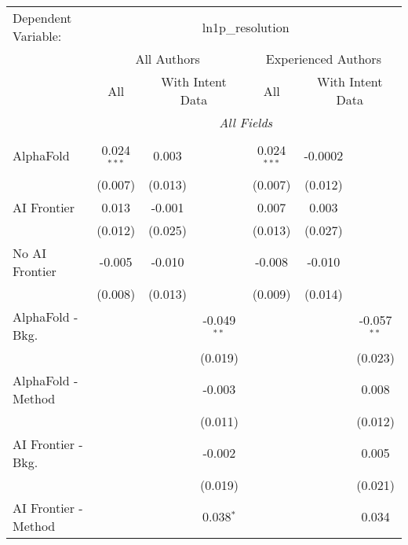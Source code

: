 \begingroup
\centering
\begin{tabular}{lcccccc}
   \tabularnewline \midrule \midrule
   Dependent Variable: & \multicolumn{6}{c}{ln1p\_resolution}\\
 & \multicolumn{3}{c}{All Authors} & \multicolumn{3}{c}{Experienced Authors} \\
\cmidrule(lr){2-4} \cmidrule(lr){5-7}
 & \multicolumn{1}{c}{All} & \multicolumn{2}{c}{With Intent Data} & \multicolumn{1}{c}{All} & \multicolumn{2}{c}{With Intent Data} \\
\cmidrule(lr){2-2} \cmidrule(lr){3-4} \cmidrule(lr){5-5} \cmidrule(lr){6-7}
 & \multicolumn{6}{c}{\textit{All Fields}} \\ \\
   AlphaFold               & 0.024$^{***}$ & 0.003   &               & 0.024$^{***}$ & -0.0002 &   \\   
                           & (0.007)       & (0.013) &               & (0.007)       & (0.012) &   \\   
   AI Frontier             & 0.013         & -0.001  &               & 0.007         & 0.003   &   \\   
                           & (0.012)       & (0.025) &               & (0.013)       & (0.027) &   \\   
   No AI Frontier          & -0.005        & -0.010  &               & -0.008        & -0.010  &   \\   
                           & (0.008)       & (0.013) &               & (0.009)       & (0.014) &   \\   
   AlphaFold - Bkg.        &               &         & -0.049$^{**}$ &               &         & -0.057$^{**}$\\   
                           &               &         & (0.019)       &               &         & (0.023)\\   
   AlphaFold - Method      &               &         & -0.003        &               &         & 0.008\\   
                           &               &         & (0.011)       &               &         & (0.012)\\   
   AI Frontier - Bkg.      &               &         & -0.002        &               &         & 0.005\\   
                           &               &         & (0.019)       &               &         & (0.021)\\   
   AI Frontier - Method    &               &         & 0.038$^{*}$   &               &         & 0.034\\   

\end{tabular}
